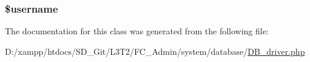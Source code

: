 \subsubsection[{\$username}]{\setlength{\rightskip}{0pt plus 5cm}\$username}\label{class_c_i___d_b__driver_a0eb82aa5f81cf845de4b36cd653c42cf}


The documentation for this class was generated from the following file\+:\begin{DoxyCompactItemize}
\item 
D\+:/xampp/htdocs/\+S\+D\+\_\+\+Git/\+L3\+T2/\+F\+C\+\_\+\+Admin/system/database/\hyperlink{_d_b__driver_8php}{D\+B\+\_\+driver.\+php}\end{DoxyCompactItemize}
